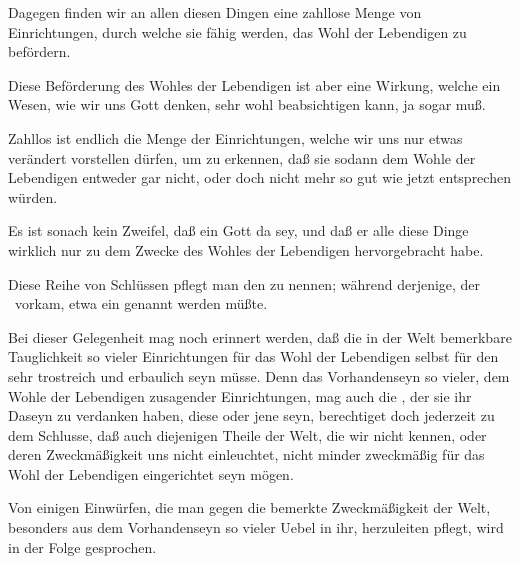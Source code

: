 \begin{aufza}
\begin{aufzb}
\item Dagegen finden wir an allen diesen Dingen eine zahllose Menge von Einrichtungen, durch welche sie fähig werden, das Wohl der Lebendigen zu befördern.
\item Diese Beförderung des Wohles der Lebendigen ist aber eine Wirkung, welche ein Wesen, wie wir uns Gott denken, sehr wohl beabsichtigen kann, ja sogar muß.
\item Zahllos ist endlich die Menge der Einrichtungen, welche wir uns nur etwas verändert vorstellen dürfen, um zu erkennen, daß sie sodann dem Wohle der Lebendigen entweder gar nicht, oder doch nicht mehr so gut wie jetzt entsprechen würden.
\end{aufzb}
Es ist sonach kein Zweifel, daß ein Gott da sey, und daß er alle diese Dinge wirklich nur zu dem Zwecke des Wohles der Lebendigen hervorgebracht habe.
\begin{RWanm}[Anm.\,1.] 
Diese Reihe von Schlüssen pflegt man den  zu nennen; während derjenige, der \ vorkam, etwa ein  genannt werden müßte.
\end{RWanm}
\begin{RWanm}[Anm.\,~2.] 
Bei dieser Gelegenheit mag noch erinnert werden, daß die in der Welt bemerkbare Tauglichkeit so vieler Einrichtungen für das Wohl der Lebendigen selbst für den  sehr trostreich und erbaulich seyn müsse. Denn das Vorhandenseyn so vieler, dem Wohle der Lebendigen zusagender Einrichtungen, mag auch die , der sie ihr Daseyn zu verdanken haben, diese oder jene seyn, berechtiget doch jederzeit zu dem Schlusse, daß auch diejenigen Theile der Welt, die wir nicht kennen, oder deren Zweckmäßigkeit uns nicht einleuchtet, nicht minder zweckmäßig für das Wohl der Lebendigen eingerichtet seyn mögen.
\end{RWanm}
\begin{RWanm}[Anm.\,~3.] 
Von einigen Einwürfen, die man gegen die bemerkte Zweckmäßigkeit der Welt, besonders aus dem Vorhandenseyn so vieler Uebel in ihr, herzuleiten pflegt, wird in der Folge gesprochen.
\end{RWanm}
\end{aufza}

